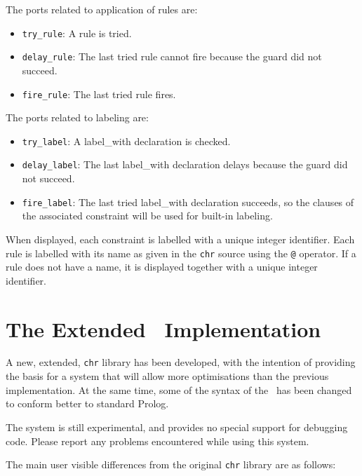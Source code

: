 The ports related to application of rules are:
\begin{itemize}
 \item \verb/try_rule/: A rule is tried.

 \item \verb/delay_rule/: The last tried rule cannot fire because the guard did not succeed.

 \item \verb/fire_rule/: The last tried rule fires.
\end{itemize}

The ports related to labeling are:
\begin{itemize}
 \item \verb/try_label/: A label\_with declaration is checked.

 \item \verb/delay_label/: The last label\_with declaration delays because the guard did not succeed.

 \item \verb/fire_label/: The last tried label\_with declaration succeeds,
so the clauses of the associated constraint will be used for built-in labeling.

\end{itemize}
When displayed, each constraint
is labelled with a unique integer identifier.  Each rule is labelled
with its name as given in the {\tt chr} source using the \verb/@/
operator. If a rule does not have a name, it is displayed together
with a unique integer identifier.

\section{The Extended \chr\ Implementation}
\label{newchr}

A new, extended, {\tt chr} library has been developed, with the intention of providing
the basis for a system that will allow more optimisations than the previous 
implementation. At the same time, some of the syntax of the \chr\  has
been changed to conform better to standard Prolog. 

The system is still experimental, and provides no special support for 
debugging {\chr\ } code. Please report any problems encountered while 
using this system.

The main user visible differences from the original {\tt chr} library are as 
follows:

